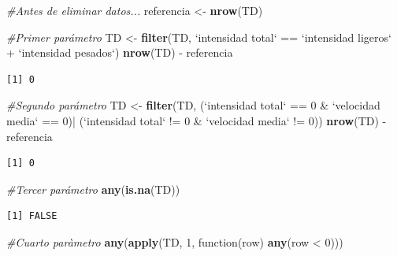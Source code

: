 \documentclass[]{article}
\newenvironment{Shaded}{\begin{snugshade}}{\end{snugshade}}
\newcommand{\KeywordTok}[1]{\textcolor[rgb]{0.13,0.29,0.53}{\textbf{{#1}}}}
\newcommand{\DataTypeTok}[1]{\textcolor[rgb]{0.13,0.29,0.53}{{#1}}}
\newcommand{\DecValTok}[1]{\textcolor[rgb]{0.00,0.00,0.81}{{#1}}}
\newcommand{\StringTok}[1]{\textcolor[rgb]{0.31,0.60,0.02}{{#1}}}
\newcommand{\CommentTok}[1]{\textcolor[rgb]{0.56,0.35,0.01}{\textit{{#1}}}}
\newcommand{\NormalTok}[1]{{#1}}
\begin{document}
\begin{Shaded}
\begin{Highlighting}[]
\CommentTok{#Antes de eliminar datos...}
\NormalTok{referencia <-}\StringTok{ }\KeywordTok{nrow}\NormalTok{(TD)}

\CommentTok{#Primer parámetro}
\NormalTok{TD <-}\StringTok{ }\KeywordTok{filter}\NormalTok{(TD, }\StringTok{`}\DataTypeTok{intensidad total}\StringTok{`} \NormalTok{==}\StringTok{ `}\DataTypeTok{intensidad ligeros}\StringTok{`} \NormalTok{+}\StringTok{ `}\DataTypeTok{intensidad pesados}\StringTok{`}\NormalTok{)}
\KeywordTok{nrow}\NormalTok{(TD) -}\StringTok{ }\NormalTok{referencia}
\end{Highlighting}
\end{Shaded}

\begin{verbatim}
[1] 0
\end{verbatim}

\begin{Shaded}
\begin{Highlighting}[]
\CommentTok{#Segundo parámetro}
\NormalTok{TD <-}\StringTok{ }\KeywordTok{filter}\NormalTok{(TD, (}\StringTok{`}\DataTypeTok{intensidad total}\StringTok{`} \NormalTok{==}\StringTok{ }\DecValTok{0} \NormalTok{&}\StringTok{ `}\DataTypeTok{velocidad media}\StringTok{`} \NormalTok{==}\StringTok{ }\DecValTok{0}\NormalTok{)|}
\StringTok{                 }\NormalTok{(}\StringTok{`}\DataTypeTok{intensidad total}\StringTok{`} \NormalTok{!=}\StringTok{ }\DecValTok{0} \NormalTok{&}\StringTok{ `}\DataTypeTok{velocidad media}\StringTok{`} \NormalTok{!=}\StringTok{ }\DecValTok{0}\NormalTok{))}
\KeywordTok{nrow}\NormalTok{(TD) -}\StringTok{ }\NormalTok{referencia}
\end{Highlighting}
\end{Shaded}

\begin{verbatim}
[1] 0
\end{verbatim}

\begin{Shaded}
\begin{Highlighting}[]
\CommentTok{#Tercer parámetro}
\KeywordTok{any}\NormalTok{(}\KeywordTok{is.na}\NormalTok{(TD))}
\end{Highlighting}
\end{Shaded}

\begin{verbatim}
[1] FALSE
\end{verbatim}

\begin{Shaded}
\begin{Highlighting}[]
\CommentTok{#Cuarto paràmetro}
\KeywordTok{any}\NormalTok{(}\KeywordTok{apply}\NormalTok{(TD, }\DecValTok{1}\NormalTok{, function(row) }\KeywordTok{any}\NormalTok{(row <}\StringTok{ }\DecValTok{0}\NormalTok{)))}
\end{Highlighting}
\end{Shaded}
\end{document}
